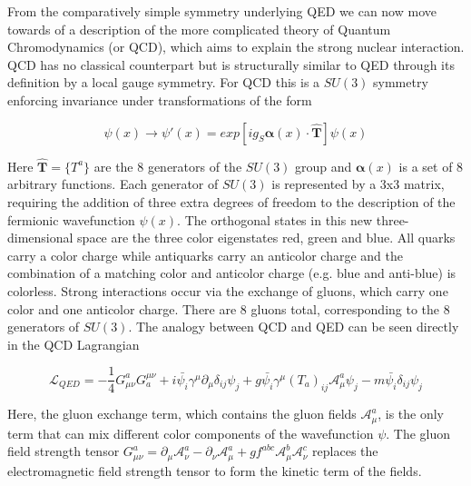 From the comparatively simple symmetry underlying QED we can now move towards of a description 
of the more complicated theory of Quantum Chromodynamics (or QCD), which aims to explain the strong nuclear 
interaction. QCD has no classical counterpart but is structurally similar to QED through its definition by a local 
gauge symmetry. For QCD this is a $SU(3)$ symmetry enforcing invariance under transformations of the form

\begin{equation}
\psi(x) \rightarrow \psi'(x) = exp[ig_{S} \boldsymbol{\alpha}(x) \cdot \boldsymbol{\hat{T}}] \psi(x)
\end{equation}

Here $\boldsymbol{\hat{T}} =  \{T^a\}$ are the 8 generators of the $SU(3)$ group and $\boldsymbol{\alpha}(x)$ is 
a set of 8 arbitrary functions. Each generator of $SU(3)$ is represented by a 3x3 matrix, requiring the addition of 
three extra degrees of freedom to the description of the fermionic wavefunction $\psi(x)$.  The orthogonal states in 
this new three-dimensional space are the three color eigenstates red, green and blue. All quarks carry a color charge 
while antiquarks carry an anticolor charge and the combination of a matching color and anticolor charge (e.g. blue and 
anti-blue) is colorless.  Strong interactions occur via the exchange of gluons, which carry one color and one anticolor 
charge. There are 8 gluons total, corresponding to the 8 generators of $SU(3)$. The analogy between QCD and QED can 
be seen directly in the QCD Lagrangian

\begin{equation}
\mathcal{L}_{QED} = 
- \frac{1}{4}G^a_{\mu\nu}G^{\mu\nu}_a + i\bar{\psi_i}\gamma^{\mu}\partial_{\mu}\delta_{ij}\psi_j +g\bar{\psi_i}\gamma^{\mu}(T_a)_{ij}\mathcal{A}^a_{\mu}\psi_j  - m\bar{\psi_i}\delta_{ij}\psi_j
\end{equation}

Here, the gluon exchange term, which contains the gluon fields $\mathcal{A}^a_{\mu}$, is the only term that can mix 
different color components of the wavefunction $\psi$. The gluon field strength tensor 
$G^a_{\mu\nu} = \partial_{\mu}\mathcal{A}^a_{\nu} - \partial_{\nu}\mathcal{A}^a_{\mu} + 
gf^{abc}\mathcal{A}^b_{\mu}\mathcal{A}^c_{\nu}$ replaces the electromagnetic field strength tensor to form the 
kinetic term of the fields. \par

